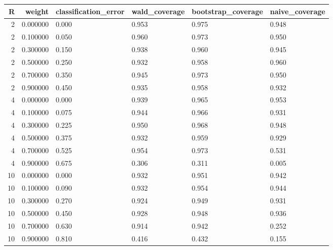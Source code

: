 \begin{tabular}{rrllll}
\toprule
R & weight & classification\_error & wald\_coverage & bootstrap\_coverage & naive\_coverage \\
\midrule
2 & 0.000000 & 0.000 & 0.953 & 0.975 & 0.948 \\
2 & 0.100000 & 0.050 & 0.960 & 0.973 & 0.950 \\
2 & 0.300000 & 0.150 & 0.938 & 0.960 & 0.945 \\
2 & 0.500000 & 0.250 & 0.932 & 0.958 & 0.960 \\
2 & 0.700000 & 0.350 & 0.945 & 0.973 & 0.950 \\
2 & 0.900000 & 0.450 & 0.935 & 0.958 & 0.932 \\
4 & 0.000000 & 0.000 & 0.939 & 0.965 & 0.953 \\
4 & 0.100000 & 0.075 & 0.944 & 0.966 & 0.931 \\
4 & 0.300000 & 0.225 & 0.950 & 0.968 & 0.948 \\
4 & 0.500000 & 0.375 & 0.932 & 0.959 & 0.929 \\
4 & 0.700000 & 0.525 & 0.954 & 0.973 & 0.531 \\
4 & 0.900000 & 0.675 & 0.306 & 0.311 & 0.005 \\
10 & 0.000000 & 0.000 & 0.932 & 0.951 & 0.942 \\
10 & 0.100000 & 0.090 & 0.932 & 0.954 & 0.944 \\
10 & 0.300000 & 0.270 & 0.924 & 0.949 & 0.931 \\
10 & 0.500000 & 0.450 & 0.928 & 0.948 & 0.936 \\
10 & 0.700000 & 0.630 & 0.914 & 0.942 & 0.252 \\
10 & 0.900000 & 0.810 & 0.416 & 0.432 & 0.155 \\
\bottomrule
\end{tabular}
